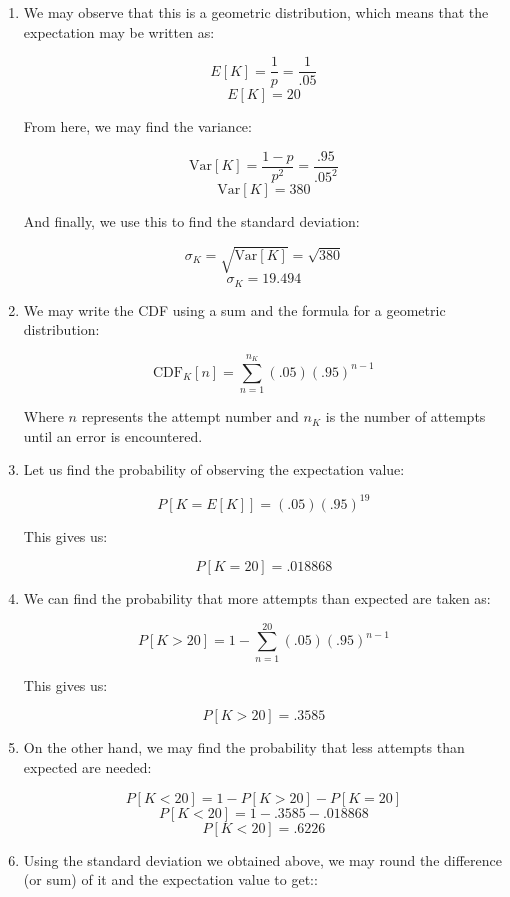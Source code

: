 \begin{enumerate}
    \begin{enumerate}

      \item We may observe that this is a geometric distribution, which means that the expectation may be written as:

        $$E[K]=\frac{1}{p}=\frac{1}{.05}$$
        $$\boxed{E[K]=20}$$

        From here, we may find the variance:

        $$\text{Var}[K]=\frac{1-p}{p^2}=\frac{.95}{.05^2}$$
        $$\boxed{\text{Var}[K]=380}$$

        And finally, we use this to find the standard deviation:

        $$\sigma_K=\sqrt{\text{Var}[K]}=\sqrt{380}$$
        $$\boxed{\sigma_K=19.494}$$

      \item We may write the CDF using a sum and the formula for a geometric distribution:

        $$\boxed{\text{CDF}_K[n]=\sum_{n=1}^{n_K}(.05)(.95)^{n-1}}$$

        Where $n$ represents the attempt number and $n_K$ is the number of attempts until an error is encountered.

      \item Let us find the probability of observing the expectation value:

        $$P[K=E[K]]=(.05)(.95)^{19}$$

        This gives us:

        $$\boxed{P[K=20]=.018868}$$

      \item We can find the probability that more attempts than expected are taken as:

        $$P[K>20]=1-\sum_{n=1}^{20}(.05)(.95)^{n-1}$$

        This gives us:

        $$\boxed{P[K>20]=.3585}$$

      \item On the other hand, we may find the probability that less attempts than expected are needed:

        $$P[K<20]=1-P[K>20]-P[K=20]$$
        $$P[K<20]=1-.3585-.018868$$
        $$\boxed{P[K<20]=.6226}$$

      \item Using the standard deviation we obtained above, we may round the difference (or sum) of it and the expectation value to get::


\end{enumerate}
\end{enumerate}
